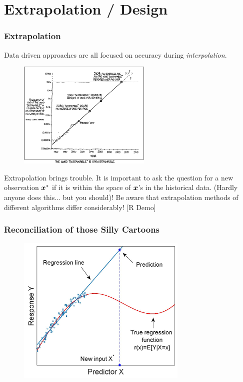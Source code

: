 \documentclass[handout]{beamer}
\begin{document}
\section{Extrapolation / Design}


\begin{frame}\frametitle{Extrapolation}
\small
Data driven approaches are all focused on accuracy during \emph{interpolation}.  

\begin{figure}
\centering
\includegraphics[width=2.5in]{extrap1.png}
\end{figure}
\vspace{-0.3cm}
Extrapolation brings trouble. It is important to ask the question for a new observation $\boldsymbol{x}^*$ if it is within the space of $\boldsymbol{x}$'s in the historical data. (Hardly anyone does this... but you should)! Be aware that extrapolation methods of different algorithms differ considerably! [R Demo]
	
\end{frame}

\begin{frame}\frametitle{Reconciliation of those Silly Cartoons}

\begin{figure}
\centering
\includegraphics[width=3.2in]{extrap.jpg}
\end{figure}

\end{frame}
\end{document}
